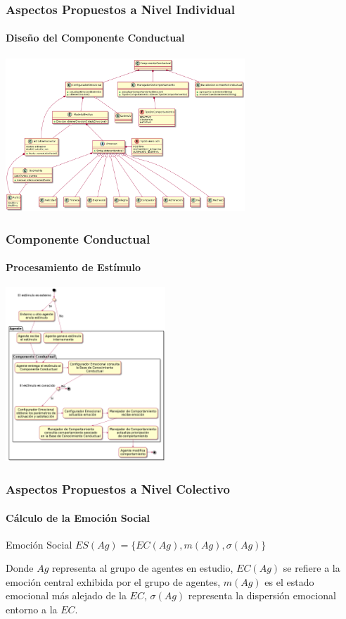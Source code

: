 \documentclass{beamer}
\begin{document}
\begin{frame}
\frametitle{Aspectos Propuestos a Nivel Individual}
\framesubtitle{Diseño del Componente Conductual}
\centering
\includegraphics[width=9cm]{ilustraciones/diseno-componente-conductual}
\end{frame}

\begin{frame}
\frametitle{Componente Conductual}
\framesubtitle{Procesamiento de Estímulo}
\centering
\includegraphics[width=6cm]{ilustraciones/procesamiento-estimulo}
\end{frame}

\begin{frame}
\frametitle{Aspectos Propuestos a Nivel Colectivo}
\framesubtitle{Cálculo de la Emoción Social}
\begin{exampleblock}{Emoción Social}
$ES(Ag) = \{EC(Ag), m(Ag), \sigma(Ag)\}$
\end{exampleblock}

Donde $Ag$ representa al grupo de agentes en estudio, $EC(Ag)$ se refiere a la
emoción central exhibida por el grupo de agentes, $m(Ag)$ es el estado emocional
más alejado de la $EC$, $\sigma(Ag)$ representa la dispersión emocional entorno
a la $EC$.
\end{frame}
\end{document}
